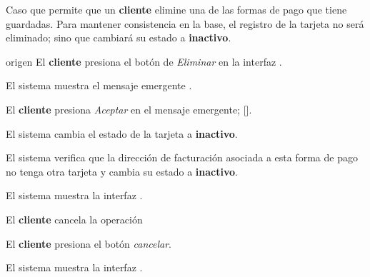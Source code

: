 %
%

{
  Caso que permite que un \textbf{cliente} elimine una de las formas de pago
  que tiene guardadas. Para mantener consistencia en la base, el registro de
  la tarjeta no será eliminado; sino que cambiará su estado a
  \textbf{inactivo}.

  \begin{trayectoriaPrincipal}

    \item[origen] El \textbf{cliente} presiona el botón de \textit{Eliminar}
      en la interfaz .

    \item El sistema muestra el mensaje emergente
      .

    \item El \textbf{cliente} presiona \textit{Aceptar} en el mensaje
      emergente; [].

    \item El sistema cambia el estado de la tarjeta a \textbf{inactivo}.

    \item El sistema verifica que la dirección de facturación asociada a esta
      forma de pago no tenga otra tarjeta y cambia su estado
      a \textbf{inactivo}.

    \item El sistema muestra la interfaz
      .

  \end{trayectoriaPrincipal}


  \begin{trayectoriaAlternativa}
    {El \textbf{cliente} cancela la operación}

    \item El \textbf{cliente} presiona el botón \textit{cancelar}.

    \item El sistema muestra la interfaz
      .

  \end{trayectoriaAlternativa}
}
